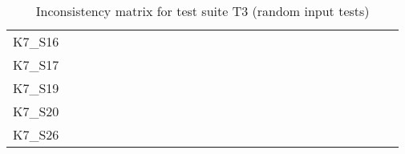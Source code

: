 \begin{table}[htpb]
\begin{tabular}{l|rrrrrrrrrrrrrrrrrrrrrrrrrr}
        K7\_S16 & \n & \n & \n & \e & \n & \n & \n & \n & \n & \n & \n & \n & \n & \n & \n & \n & \n & \n & \n & \e & \n & \n & \e & \n & \n & \n \\
        K7\_S17 & \n & \n & \n & \n & \n & \n & \n & \n & \e & \n & \n & \n & \n & \n & \n & \n & \n & \n & \n & \e & \n & \n & \e & \n & \e & \n \\
        K7\_S19 & \n & \n & \n & \n & \n & \n & \n & \n & \n & \n & \n & \n & \n & \e & \n & \n & \n & \n & \n & \n & \e & \n & \n & \e & \n & \n \\
        K7\_S20 & \n & \n & \n & \n & \n & \n & \n & \n & \n & \n & \n & \n & \n & \n & \n & \n & \n & \n & \n & \n & \n & \n & \n & \n & \n & \n \\
        K7\_S26 & \n & \n & \n & \n & \n & \n & \n & \n & \n & \n & \n & \n & \n & \n & \n & \n & \n & \n & \n & \n & \n & \e & \n & \n & \n & \n \\
        \bottomrule
    \end{tabular}
    \caption{Inconsistency matrix for test suite T3 (random input tests)}
    \label{tab:inconsistencies_matrix_random}
    \setlength{\tabcolsep}{\defaulttabcolsep}
\end{table}

